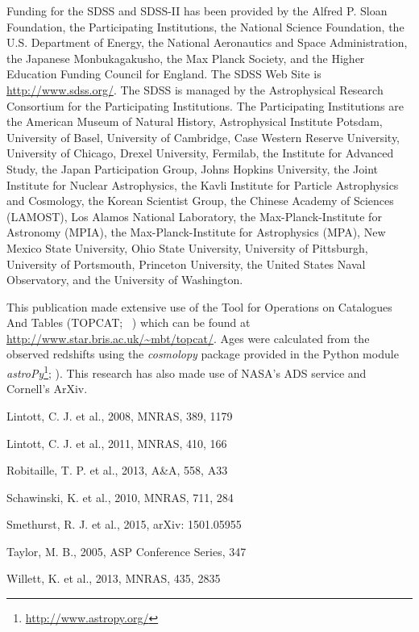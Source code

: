 \documentclass[useAMS,usenatbib]{mn2e}
\begin{document}
Funding for the SDSS and SDSS-II has been provided by the Alfred P. Sloan Foundation, the Participating Institutions, the National Science Foundation, the U.S. Department of Energy, the National Aeronautics and Space Administration, the Japanese Monbukagakusho, the Max Planck Society, and the Higher Education Funding Council for England. The SDSS Web Site is \url{http://www.sdss.org/}.
The SDSS is managed by the Astrophysical Research Consortium for the Participating Institutions. The Participating Institutions are the American Museum of Natural History, Astrophysical Institute Potsdam, University of Basel, University of Cambridge, Case Western Reserve University, University of Chicago, Drexel University, Fermilab, the Institute for Advanced Study, the Japan Participation Group, Johns Hopkins University, the Joint Institute for Nuclear Astrophysics, the Kavli Institute for Particle Astrophysics and Cosmology, the Korean Scientist Group, the Chinese Academy of Sciences (LAMOST), Los Alamos National Laboratory, the Max-Planck-Institute for Astronomy (MPIA), the Max-Planck-Institute for Astrophysics (MPA), New Mexico State University, Ohio State University, University of Pittsburgh, University of Portsmouth, Princeton University, the United States Naval Observatory, and the University of Washington.

This publication made extensive use of the Tool for Operations on Catalogues And Tables (TOPCAT; ~\citealt{Taylor05}) which can be found at \url{http://www.star.bris.ac.uk/~mbt/topcat/}. Ages were calculated from the observed redshifts using the \emph{cosmolopy} package provided in the Python module \emph{astroPy}\footnote{\url{http://www.astropy.org/}}; \citealt{Rob13}). This research has also made use of NASA's ADS service and Cornell's ArXiv. 

\begin{thebibliography}{}

 Lintott, C. J. et al., 2008, MNRAS, 389, 1179

 Lintott, C. J. et al., 2011, MNRAS, 410, 166

 Robitaille, T. P. et al., 2013, A\&A, 558, A33

 Schawinski, K. et al., 2010, MNRAS, 711, 284

 Smethurst, R. J. et al., 2015, arXiv: 1501.05955

 Taylor, M. B., 2005, ASP Conference Series, 347

 Willett, K. et al., 2013, MNRAS, 435, 2835

\end{thebibliography}{}

\appendix
\end{document}
